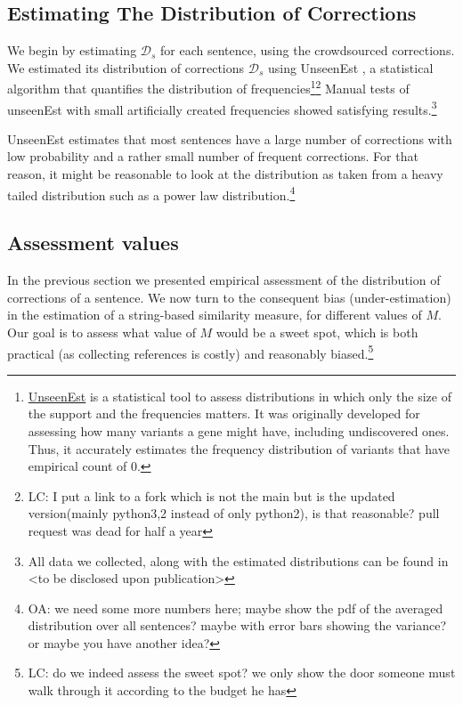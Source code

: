 \documentclass[english]{article}
\newcommand{\oa}[1]{\footnote{\color{red}OA: #1}}
\newcommand{\lc}[1]{\footnote{\color{green}LC: #1}}
\begin{document}
\subsection{Estimating The Distribution of Corrections}

We begin by estimating $\mathcal{D}_s$ for each sentence, using the crowdsourced
corrections. We estimated its distribution of corrections $\mathcal{D}_s$
using {\sc UnseenEst} \cite{zou2015quantifying}, a statistical algorithm that quantifies
the distribution of frequencies\footnote{\href{https://github.com/borgr/unseenest}{UnseenEst} is a statistical tool to assess distributions in which only the size of the support and the frequencies matters. It was originally developed for assessing how many variants a gene might have, including undiscovered ones. Thus, it accurately estimates the frequency distribution of variants that have empirical count of 0. }\lc{I put a link to a fork which is not the main but is the updated version(mainly python3,2 instead of only python2), is that reasonable? pull request was dead for half a year} Manual tests of unseenEst with small artificially created frequencies showed
satisfying results.\footnote{All data
  we collected, along with the estimated distributions can be found in <to be disclosed
  upon publication>}

{\sc UnseenEst} estimates that most sentences have a large number of corrections with low probability and a rather small number of frequent corrections. For that reason, it might be reasonable to look at the distribution as taken from a heavy tailed distribution such as a power law distribution.\oa{we need some more numbers here; maybe show the pdf of the averaged distribution over all sentences? maybe with error bars showing the variance? or maybe you have another idea?}

\subsection{Assessment values}\label{subsec:Assessment-values}

In the previous section we presented empirical assessment of the distribution of
corrections of a sentence. We now turn to the consequent bias (under-estimation) in the estimation of a string-based similarity measure, for different values of $M$. Our goal is to assess what value of $M$ would be a sweet spot, which is both practical (as collecting references is costly) and reasonably biased.\lc{do we indeed assess the sweet spot? we only show the door someone must walk through it according to the budget he has}
\end{document}
